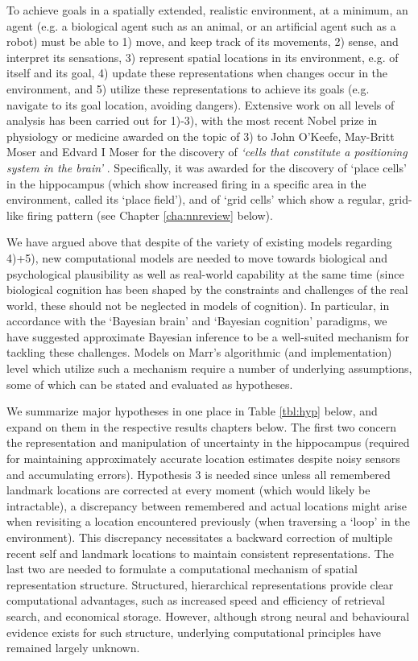 To achieve goals in a spatially extended, realistic environment, at a minimum, an agent (e.g. a biological agent such as an animal, or an artificial agent such as a robot) must be able to 1) move, and keep track of its movements, 2) sense, and interpret its sensations, 3) represent spatial locations in its environment, e.g. of itself and its goal, 4) update these representations when changes occur in the environment, and 5) utilize these representations to achieve its goals (e.g. navigate to its goal location, avoiding dangers). Extensive work on all levels of analysis has been carried out for 1)-3), with the most recent Nobel prize in physiology or medicine awarded on the topic of 3) to John O'Keefe, May-Britt Moser and Edvard I Moser for the discovery of \textit{`cells that constitute a positioning system in the brain'} \citep{burgess2014nobel}. Specifically, it was awarded for the discovery of `place cells' in the hippocampus (which show increased firing in a specific area in the environment, called its `place field'), and of `grid cells' which show a regular, grid-like firing pattern (see Chapter \ref{cha:nnreview} below). 

We have argued above that despite of the variety of existing models regarding 4)+5), new computational models are needed to move towards biological and psychological plausibility as well as real-world capability at the same time (since biological cognition has been shaped by the constraints and challenges of the real world, these should not be neglected in models of cognition). In particular, in accordance with the `Bayesian brain' \citep{knill2004bayesian} and `Bayesian cognition' \citep{chater2010bayesian} paradigms, we have suggested approximate Bayesian inference to be a well-suited mechanism for tackling these challenges. Models on Marr's algorithmic (and implementation) level which utilize such a mechanism require a number of underlying assumptions, some of which can be stated and evaluated as hypotheses. 

We summarize major hypotheses in one place in Table \ref{tbl:hyp} below, and expand on them in the respective results chapters below. The first two concern the representation and manipulation of uncertainty in the hippocampus (required for maintaining approximately accurate location estimates despite noisy sensors and accumulating errors). Hypothesis 3 is needed since unless all remembered landmark locations are corrected at every moment (which would likely be intractable), a discrepancy between remembered and actual locations might arise when revisiting a location encountered previously (when traversing a `loop' in the environment). This discrepancy necessitates a backward correction of multiple recent self and landmark locations to maintain consistent representations. The last two are needed to formulate a computational mechanism of spatial representation structure. Structured, hierarchical representations provide clear computational advantages, such as increased speed and efficiency of retrieval search, and economical storage. However, although strong neural \citep{derdikman2010manifold} and behavioural \citep{hirtle1985evidence, mcnamara1989subjective, greenauer2010micro} evidence exists for such structure, underlying computational principles have remained largely unknown.

